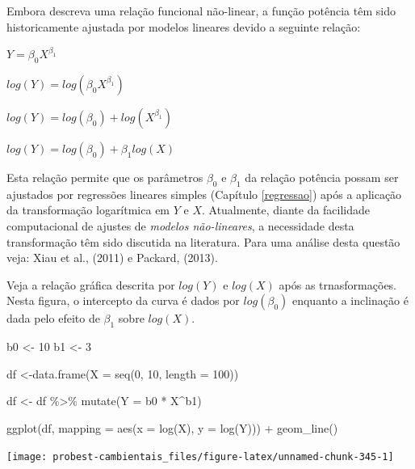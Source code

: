\documentclass[
]{book}
\newenvironment{Shaded}{\begin{snugshade}}{\end{snugshade}}
\newcommand{\AttributeTok}[1]{\textcolor[rgb]{0.77,0.63,0.00}{#1}}
\newcommand{\DecValTok}[1]{\textcolor[rgb]{0.00,0.00,0.81}{#1}}
\newcommand{\FunctionTok}[1]{\textcolor[rgb]{0.00,0.00,0.00}{#1}}
\newcommand{\NormalTok}[1]{#1}
\newcommand{\OtherTok}[1]{\textcolor[rgb]{0.56,0.35,0.01}{#1}}
\newcommand{\SpecialCharTok}[1]{\textcolor[rgb]{0.00,0.00,0.00}{#1}}
\begin{document}
Embora descreva uma relação funcional não-linear, a função potência têm sido historicamente ajustada por modelos lineares devido a seguinte relação:

\(Y = \beta_{0}X^{\beta_{1}}\)

\(log(Y) = log(\beta_{0}X^{\beta_{1}})\)

\(log(Y) = log(\beta_{0}) + log(X^{\beta_{1}})\)

\(log(Y) = log(\beta_{0}) + \beta_{1}log(X)\)

Esta relação permite que os parâmetros \(\beta_0\) e \(\beta_1\) da relação potência possam ser ajustados por regressões lineares simples (Capítulo \ref{regressao}) após a aplicação da transformação logarítmica em \(Y\) e \(X\). Atualmente, diante da facilidade computacional de ajustes de \emph{modelos não-lineares}, a necessidade desta transformação têm sido discutida na literatura. Para uma análise desta questão veja: Xiau et al., (2011) e Packard, (2013).

Veja a relação gráfica descrita por \(log(Y)\) e \(log(X)\) após as trnasformações. Nesta figura, o intercepto da curva é dados por \(log(\beta_0)\) enquanto a inclinação é dada pelo efeito de \(\beta_1\) sobre \(log(X)\).

\begin{Shaded}
\begin{Highlighting}[]
\NormalTok{b0 }\OtherTok{\textless{}{-}} \DecValTok{10}
\NormalTok{b1 }\OtherTok{\textless{}{-}} \DecValTok{3}

\NormalTok{df }\OtherTok{\textless{}{-}}\FunctionTok{data.frame}\NormalTok{(}\AttributeTok{X =} \FunctionTok{seq}\NormalTok{(}\DecValTok{0}\NormalTok{, }\DecValTok{10}\NormalTok{, }\AttributeTok{length =} \DecValTok{100}\NormalTok{))}

\NormalTok{df }\OtherTok{\textless{}{-}}\NormalTok{ df }\SpecialCharTok{\%\textgreater{}\%} \FunctionTok{mutate}\NormalTok{(}\AttributeTok{Y =}\NormalTok{ b0 }\SpecialCharTok{*}\NormalTok{ X}\SpecialCharTok{\^{}}\NormalTok{b1)}

\FunctionTok{ggplot}\NormalTok{(df, }\AttributeTok{mapping =} \FunctionTok{aes}\NormalTok{(}\AttributeTok{x =} \FunctionTok{log}\NormalTok{(X), }\AttributeTok{y =} \FunctionTok{log}\NormalTok{(Y))) }\SpecialCharTok{+}
  \FunctionTok{geom\_line}\NormalTok{()}
\end{Highlighting}
\end{Shaded}

\begin{center}\texttt{[image: probest-cambientais\_files/figure-latex/unnamed-chunk-345-1]} \end{center}
\end{document}
